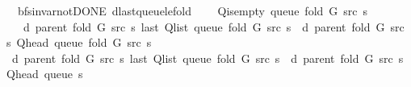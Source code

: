 \begin{isabellebody}
{\isafoldproof}%
%
\isadelimproof
\isanewline
%
\endisadelimproof
\isanewline
{}\isamarkupfalse%
\ {\isacharparenleft}{\kern0pt}\ bfs{\isacharunderscore}{\kern0pt}invar{\isacharunderscore}{\kern0pt}not{\isacharunderscore}{\kern0pt}DONE{\isacharparenright}{\kern0pt}\ d{\isacharunderscore}{\kern0pt}last{\isacharunderscore}{\kern0pt}queue{\isacharunderscore}{\kern0pt}le{\isacharunderscore}{\kern0pt}fold{\isacharcolon}{\kern0pt}\isanewline
\ \ \ {\isachardoublequoteopen}{\isasymnot}\ Q{\isacharunderscore}{\kern0pt}is{\isacharunderscore}{\kern0pt}empty\ {\isacharparenleft}{\kern0pt}queue\ {\isacharparenleft}{\kern0pt}fold\ G\ src\ s{\isacharparenright}{\kern0pt}{\isacharparenright}{\kern0pt}{\isachardoublequoteclose}\isanewline
\ \ \ {\isachardoublequoteopen}d\ {\isacharparenleft}{\kern0pt}parent\ {\isacharparenleft}{\kern0pt}fold\ G\ src\ s{\isacharparenright}{\kern0pt}{\isacharparenright}{\kern0pt}\ {\isacharparenleft}{\kern0pt}last\ {\isacharparenleft}{\kern0pt}Q{\isacharunderscore}{\kern0pt}list\ {\isacharparenleft}{\kern0pt}queue\ {\isacharparenleft}{\kern0pt}fold\ G\ src\ s{\isacharparenright}{\kern0pt}{\isacharparenright}{\kern0pt}{\isacharparenright}{\kern0pt}{\isacharparenright}{\kern0pt}\ {\isasymle}\ d\ {\isacharparenleft}{\kern0pt}parent\ {\isacharparenleft}{\kern0pt}fold\ G\ src\ s{\isacharparenright}{\kern0pt}{\isacharparenright}{\kern0pt}\ {\isacharparenleft}{\kern0pt}Q{\isacharunderscore}{\kern0pt}head\ {\isacharparenleft}{\kern0pt}queue\ {\isacharparenleft}{\kern0pt}fold\ G\ src\ s{\isacharparenright}{\kern0pt}{\isacharparenright}{\kern0pt}{\isacharparenright}{\kern0pt}\ {\isacharplus}{\kern0pt}\ {}{\isachardoublequoteclose}\isanewline
%
\isadelimproof
%
\endisadelimproof
%
\isatagproof
{}\isamarkupfalse%
\ {\isacharminus}{\kern0pt}\isanewline
\ \ \isamarkupfalse%
\ {\isachardoublequoteopen}d\ {\isacharparenleft}{\kern0pt}parent\ {\isacharparenleft}{\kern0pt}fold\ G\ src\ s{\isacharparenright}{\kern0pt}{\isacharparenright}{\kern0pt}\ {\isacharparenleft}{\kern0pt}last\ {\isacharparenleft}{\kern0pt}Q{\isacharunderscore}{\kern0pt}list\ {\isacharparenleft}{\kern0pt}queue\ {\isacharparenleft}{\kern0pt}fold\ G\ src\ s{\isacharparenright}{\kern0pt}{\isacharparenright}{\kern0pt}{\isacharparenright}{\kern0pt}{\isacharparenright}{\kern0pt}\ {\isasymle}\ d\ {\isacharparenleft}{\kern0pt}parent\ {\isacharparenleft}{\kern0pt}fold\ G\ src\ s{\isacharparenright}{\kern0pt}{\isacharparenright}{\kern0pt}\ {\isacharparenleft}{\kern0pt}Q{\isacharunderscore}{\kern0pt}head\ {\isacharparenleft}{\kern0pt}queue\ s{\isacharparenright}{\kern0pt}{\isacharparenright}{\kern0pt}\ {\isacharplus}{\kern0pt}\ {}{\isachardoublequoteclose}\isanewline

\end{isabellebody}
